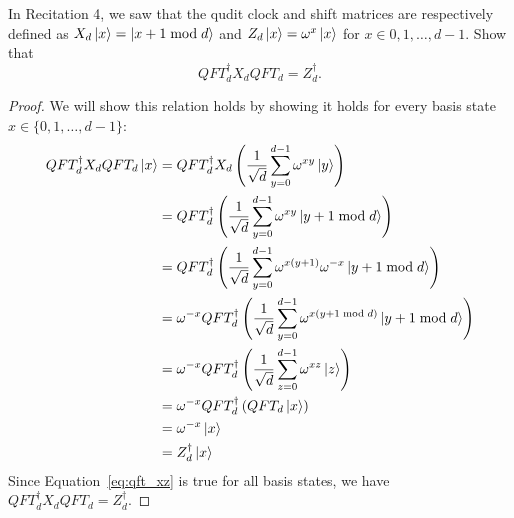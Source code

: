 \begin{solution}[label=ques:2d]
  \begin{question}
    In Recitation 4, we saw that the qudit clock and shift matrices are respectively defined as $X_d\ket{x} = \ket{x + 1 \bmod d}$ and $Z_d\ket{x} = \omega^x\ket{x}$ for $x \in 0,1,\ldots,d-1$. Show that $$QFT_d^\dagger X_d QFT_d = Z_d^\dagger.$$
  \end{question}
  \tcblower{}
  \begin{proof}
    We will show this relation holds by showing it holds for every basis state $x \in \{0, 1, \ldots, d-1\}$:
    \begin{equation}
      \begin{split}
        QFT_d^\dagger X_d QFT_d\ket{x} &= QFT_d^\dagger X_d\left(\frac{1}{\sqrt{d}}\sum_{y=0}^{d-1}\omega^{xy}\ket{y}\right)\\
        &= QFT_d^\dagger\left(\frac{1}{\sqrt{d}}\sum_{y=0}^{d-1}\omega^{xy}\ket{y+1 \bmod d}\right)\\
        &= QFT_d^\dagger\left(\frac{1}{\sqrt{d}}\sum_{y=0}^{d-1}\omega^{x(y+1)}\omega^{-x}\ket{y+1 \bmod d}\right)\\
        &= \omega^{-x}QFT_d^\dagger\left(\frac{1}{\sqrt{d}}\sum_{y=0}^{d-1}\omega^{x(y+1 \bmod d)}\ket{y+1 \bmod d}\right)\\
        &= \omega^{-x}QFT_d^\dagger\left(\frac{1}{\sqrt{d}}\sum_{z=0}^{d-1}\omega^{xz}\ket{z}\right)\\
        &= \omega^{-x}QFT_d^\dagger\left(QFT_d\ket{x}\right)\\
        &= \omega^{-x}\ket{x}\\
        &= Z_d^\dagger\ket{x}
      \end{split}
      \label{eq:qft_xz}
    \end{equation}
    Since Equation~\ref{eq:qft_xz} is true for all basis states, we have $QFT_d^\dagger X_d QFT_d = Z_d^\dagger$.
  \end{proof}
\end{solution}
